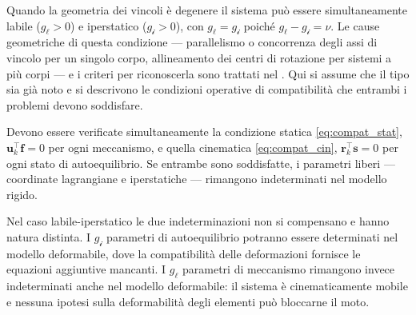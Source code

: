 Quando la geometria dei vincoli è degenere il sistema può essere
simultaneamente labile ($g_\ell > 0$) e iperstatico
($g_{\mathscr{i}} > 0$), con $g_\ell = g_{\mathscr{i}}$ poiché
$g_\ell - g_{\mathscr{i}} = \nu$. Le cause geometriche di questa
condizione --- parallelismo o concorrenza degli assi di vincolo
per un singolo corpo, allineamento dei centri di rotazione per
sistemi a più corpi --- e i criteri per riconoscerla sono trattati
nel . Qui si assume che il tipo
sia già noto e si descrivono le condizioni operative di compatibilità
che entrambi i problemi devono soddisfare.

Devono essere verificate simultaneamente la condizione statica
\eqref{eq:compat_stat}, $\bm{u}_k^{\top}\bm{f} = 0$ per ogni
meccanismo, e quella cinematica \eqref{eq:compat_cin},
$\bm{r}_k^{\top}\bm{s} = 0$ per ogni stato di autoequilibrio.
Se entrambe sono soddisfatte, i parametri liberi --- coordinate
lagrangiane e iperstatiche --- rimangono indeterminati nel modello
rigido.

\begin{oss}
	Nel caso labile-iperstatico le due indeterminazioni non si
	compensano e hanno natura distinta. I $g_{\mathscr{i}}$
	parametri di autoequilibrio potranno essere determinati
	nel modello deformabile, dove la compatibilità delle
	deformazioni fornisce le equazioni aggiuntive mancanti.
	I $g_\ell$ parametri di meccanismo rimangono invece
	indeterminati anche nel modello deformabile: il sistema
	è cinematicamente mobile e nessuna ipotesi sulla
	deformabilità degli elementi può bloccarne il moto.
\end{oss}

